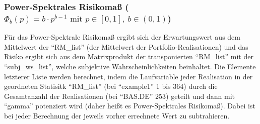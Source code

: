 \documentclass[paper=landscape]{scrartcl}
\begin{document}
    \hypertarget{power-spektrales-risikomauxdf-phi_bpb-cdot-pb-1-text-mit-p-in-left01right-b-in-left01right}{%
\subsubsection{\texorpdfstring{Power-Spektrales Risikomaß
(\(\Phi_b(p)=b \cdot p^{b-1} \text{ mit } p \in \left[0,1\right], ~b \in \left(0,1\right)\))}{Power-Spektrales Risikomaß (\textbackslash Phi\_b(p)=b \textbackslash cdot p\^{}\{b-1\} \textbackslash text\{ mit \} p \textbackslash in \textbackslash left{[}0,1\textbackslash right{]}, \textasciitilde b \textbackslash in \textbackslash left(0,1\textbackslash right))}}\label{power-spektrales-risikomauxdf-phi_bpb-cdot-pb-1-text-mit-p-in-left01right-b-in-left01right}}

Für das Power-Spektrale Risikomaß ergibt sich der Erwartungswert aus dem
Mittelwert der ``RM\_list'' (der Mittelwert der Portfolio-Realisationen)
und das Risiko ergibt sich aus dem Matrixprodukt der transponierten
``RM\_list'' mit der ``subj\_ws\_list'', welche subjektive
Wahrscheinlichkeiten beinhaltet. Die Elemente letzterer Liste werden
berechnet, indem die Laufvariable jeder Realisation in der geordneten
Statisitk ``RM\_list'' (bei ``example1'' 1 bis 364) durch die
Gesamtanzahl der Realisationen (bei ``BAS.DE'' 253) geteilt und dann mit
``gamma'' potenziert wird (daher heißt es Power-Spektrales Risikomaß).
Dabei ist bei jeder Berechnung der jeweils vorher errechnete Wert zu
subtrahieren.
\end{document}
